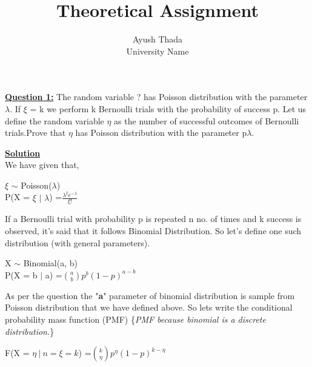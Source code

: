 \documentclass[12pt]{article}
\begin{document}
 
 
\title{Theoretical Assignment}
\author{Ayush Thada \\
{University Name}}

\maketitle
\textbf{\underline{Question 1:}} The random variable ? has Poisson distribution with the parameter $\lambda$. If $\xi$ = k we perform k Bernoulli trials with the probability of success p. Let us define the random variable $\eta$ as the number of successful outcomes of Bernoulli trials.Prove that $\eta$ has Poisson distribution with the parameter p$\lambda$.

        \textbf{\underline{Solution}}\\
        We have given that,
        
        \begin{center}
        $\xi$ $\sim$ Poisson($\lambda$)\\
        P(X = $\xi$ $|$ $\lambda$) =\LARGE	$\frac{\lambda^{\xi}e^{-\lambda}}{\xi!}$\normalsize\\
        \end{center}
        
        If a Bernoulli trial with probability p is repeated n no. of times and k success is observed, it's said that it follows Binomial Distribution. So let's define one such distribution (with general parameters).
        
        \begin{center}
        X $\sim$ Binomial(a, b)\\
        P(X = b $|$ a) =\Large $\binom{a}{b} p^{b} (1-p)^{a-b} $ \normalsize\\
        \end{center}
        
        As per the question the "\textbf{a}" parameter of binomial distribution is sample from Poisson distribution that we have defined above. So lets write the conditional probability mass function (PMF) \{\textit{PMF because binomial is a discrete distribution.}\}\\
        
        \begin{center}
        F(X = $\eta\ |\ n=\xi=k$) =\Large $\binom{k}{\eta} p^{\eta} (1-p)^{k-\eta} $ \normalsize\\
        \end{center}
        
\end{document}

